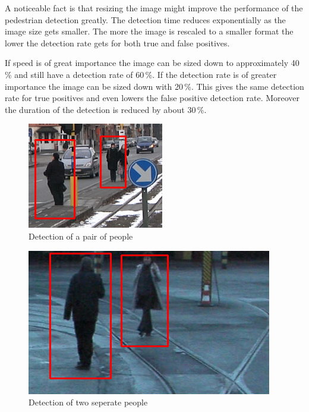 \documentclass{article}
\begin{document}
\par
A noticeable fact is that resizing the image might improve the performance of the pedestrian detection greatly. The detection time reduces exponentially as the image size gets smaller. The more the image is rescaled to a smaller format the lower the detection rate gets for both true and false positives.
\par
If speed is of great importance the image can be sized down to approximately 40\,\% and still have a detection rate of 60\,\%. If the detection rate is of greater importance the image can be sized down with 20\,\%. This gives the same detection rate for true positives and even lowers the false positive detection rate. Moreover the duration of the detection is reduced by about 30\,\%.
\begin{table}
\centering
{}
\caption{Test results when resizing the image}
\label{table:test}
\end{table}
\begin{figure}[h!]
	\centering
	\includegraphics[scale=0.75]{peopledetection1.png}
	\caption{Detection of a pair of people}
	\label{fig:pdetection1}
\end{figure}
\begin{figure}[h!]
	\centering
	\includegraphics[scale=0.5]{peopledetection2.png}
	\caption{Detection of two seperate people}
	\label{fig:pdetection2}
\end{figure}
\end{document}
